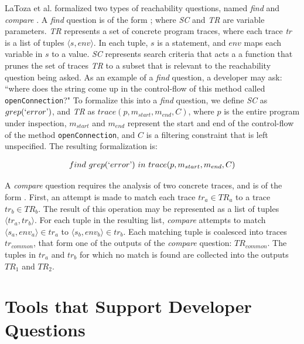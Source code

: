 \noindent LaToza et al. formalized two types of reachability questions, named
\textit{find} and \textit{compare} \cite{latoza-2010-reach}.
A \textit{find} question is of the form \findq{}; where \textit{SC} and
\textit{TR} are variable parameters.
\textit{TR} represents a set of concrete program traces, where each trace 
\textit{tr} is a list of tuples $\langle s, env \rangle$. 
In each tuple, $s$ is a statement, and $env$ maps each variable in $s$ to a
value.
\textit{SC} represents search criteria that acts a a function that prunes the
set of traces \textit{TR} to a subset that is relevant to the reachability
question being asked.
As an example of a \textit{find} question, a developer may ask: ``where does
the string  come up in the control-flow of this method called 
\texttt{openConnection}?"
To formalize this into a \textit{find} question, we define \textit{SC} as
$grep(`error\textrm')$, and \textit{TR} as 
$trace(p, m_{start}, m_{end}, C)$, where $p$ is the entire program under
inspection, $m_{start}$ and $m_{end}$ represent the start and end of the
control-flow of the method \texttt{openConnection}, and $C$ is a filtering
constraint that is left unspecified.
The resulting formalization is:

\begin{align*}
  find \ grep(`error\textrm') \ in \ trace(p, m_{start}, m_{end}, C)
\end{align*}


A \textit{compare} question requires the analysis of two concrete traces, and
is of the form \compareq{}.
First, an attempt is made to match each trace $tr_a \in TR_a$ to a trace 
$tr_b \in TR_b$.
The result of this operation may be represented as a list of tuples 
$\langle tr_a, tr_b \rangle$.
For each tuple in the resulting list, \textit{compare} attempts to match 
$\langle s_a, env_a\rangle \in tr_a$ to $\langle s_b, env_b \rangle \in tr_b$.
Each matching tuple is coalesced into traces $tr_{common}$, that form one
of the outputs of the \textit{compare} question: $TR_{common}$.
The tuples in $tr_a$ and $tr_b$ for which no match is found are collected into
the outputs $TR_1$ and $TR_2$.



\section{Tools that Support Developer Questions}
\label{sec:ToolsSupportDeveloperQuestions}

